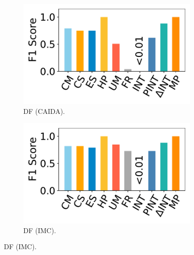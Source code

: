 \begin{figure}[t]
    \begin{subfigure}{0.49\linewidth}
    \centering
    \includegraphics[width=\linewidth]{pics/dfF1-caida.pdf}
    \vspace{-20pt}
    \caption{DF (CAIDA).}
    \end{subfigure}
    \begin{subfigure}{0.49\linewidth}
    \centering
    \includegraphics[width=\linewidth]{pics/dfF1-imc.pdf}
    \vspace{-20pt}
    \caption{DF (IMC).}
    \end{subfigure}


\end{figure}
